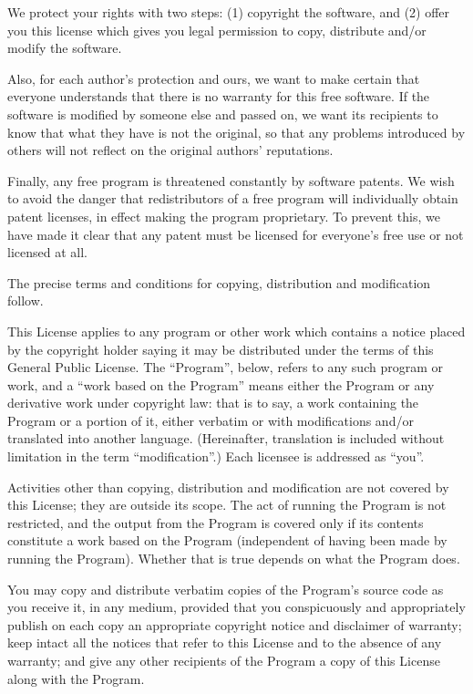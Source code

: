 \begin{lrbox}{\gpl}
\begin{minipage}{3\textwidth}
We protect your rights with two steps: (1) copyright the software, and (2)
offer you this license which gives you legal permission to copy,
distribute and/or modify the software.

Also, for each author's protection and ours, we want to make certain that
everyone understands that there is no warranty for this free software.  If
the software is modified by someone else and passed on, we want its
recipients to know that what they have is not the original, so that any
problems introduced by others will not reflect on the original authors'
reputations.

Finally, any free program is threatened constantly by software patents.
We wish to avoid the danger that redistributors of a free program will
individually obtain patent licenses, in effect making the program
proprietary.  To prevent this, we have made it clear that any patent must
be licensed for everyone's free use or not licensed at all.

The precise terms and conditions for copying, distribution and
modification follow.

\begincentered
\endcentered

\beginenumeration
\item This License applies to any program or other work which contains
      a notice placed by the copyright holder saying it may be
      distributed under the terms of this General Public License.  The
      ``Program'', below, refers to any such program or work, and a
      ``work based on the Program'' means either the Program or any
      derivative work under copyright law: that is to say, a work
      containing the Program or a portion of it, either verbatim or
      with modifications and/or translated into another language.
      (Hereinafter, translation is included without limitation in the
      term ``modification''.) Each licensee is addressed as ``you''.

      Activities other than copying, distribution and modification are
      not covered by this License; they are outside its scope.  The act
      of running the Program is not restricted, and the output from the
      Program is covered only if its contents constitute a work based
      on the Program (independent of having been made by running the
      Program). Whether that is true depends on what the Program does.

\item You may copy and distribute verbatim copies of the Program's source
      code as you receive it, in any medium, provided that you
      conspicuously and appropriately publish on each copy an
      appropriate copyright notice and disclaimer of warranty; keep
      intact all the notices that refer to this License and to the
      absence of any warranty; and give any other recipients of the
      Program a copy of this License along with the Program.


\end{minipage}
\end{lrbox}
